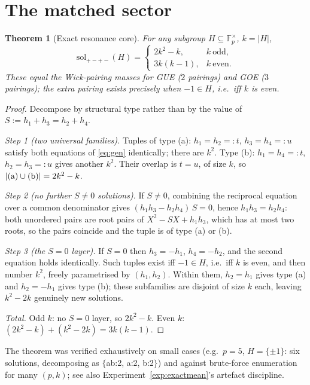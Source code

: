 \documentclass[11pt]{article}
\newtheorem{theorem}{Theorem}
\begin{document}
\section{The matched sector}\label{sec:matched}

\begin{theorem}[Exact resonance core]\label{thm:core}
For any subgroup $H\subseteq\mathbb F_p^\times$, $k=|H|$,
\[
\mathrm{sol}_{+-+-}(H)=
\begin{cases}
2k^2-k,& k\ \text{odd},\\[0.4em]
3k(k-1),& k\ \text{even}.
\end{cases}
\]
These equal the Wick-pairing masses for GUE ($2$ pairings) and GOE
($3$ pairings); the extra pairing exists precisely when
$-1\in H$, i.e.\ iff $k$ is even.
\end{theorem}

\begin{proof}
Decompose by structural type rather than by the value of
$S:=h_1+h_3=h_2+h_4$.

\emph{Step 1 (two universal families).} Tuples of type
(a): $h_1=h_2=:t$, $h_3=h_4=:u$ satisfy both equations of
\eqref{eq:gen} identically; there are $k^2$. Type
(b): $h_1=h_4=:t$, $h_2=h_3=:u$ gives another $k^2$. Their overlap is
$t=u$, of size $k$, so
$|{\rm(a)}\cup{\rm(b)}|=2k^2-k$.

\emph{Step 2 (no further $S\neq0$ solutions).} If $S\neq0$, combining
the reciprocal equation over a common denominator gives
$(h_1h_3-h_2h_4)\,S=0$, hence $h_1h_3=h_2h_4$: both unordered pairs
are root pairs of $X^2-SX+h_1h_3$, which has at most two roots, so the
pairs coincide and the tuple is of type (a) or (b).

\emph{Step 3 (the $S=0$ layer).} If $S=0$ then $h_3=-h_1$,
$h_4=-h_2$, and the second equation holds identically. Such tuples
exist iff $-1\in H$, i.e.\ iff $k$ is even, and then number $k^2$,
freely parametrised by $(h_1,h_2)$. Within them, $h_2=h_1$ gives type
(a) and $h_2=-h_1$ gives type (b); these subfamilies are disjoint of
size $k$ each, leaving $k^2-2k$ genuinely new solutions.

\emph{Total.} Odd $k$: no $S=0$ layer, so $2k^2-k$. Even $k$:
$(2k^2-k)+(k^2-2k)=3k(k-1)$.
\end{proof}

The theorem was verified exhaustively on small cases (e.g.\ $p=5$,
$H=\{\pm1\}$: six solutions, decomposing as $\{$ab:2, a:2, b:2$\}$)
and against brute-force enumeration for many $(p,k)$; see also
Experiment~\ref{exp:exactmean}'s artefact discipline.
\end{document}
